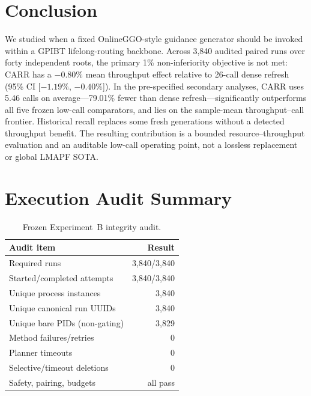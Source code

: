 \documentclass[sigconf,review,anonymous]{acmart}
\newcommand{\carr}{\textsc{CARR}\xspace}
\begin{document}
\section{Conclusion}

We studied when a fixed OnlineGGO-style guidance generator should be invoked
within a GPIBT lifelong-routing backbone. Across 3{,}840 audited paired runs
over forty independent roots, the primary 1\% non-inferiority objective is not
met: \carr has a $-0.80\%$ mean throughput effect relative to 26-call dense
refresh (95\% CI [$-1.19\%$, $-0.40\%$]). In the pre-specified secondary
analyses, \carr uses 5.46 calls on average---79.01\% fewer than dense
refresh---significantly outperforms all five frozen low-call comparators, and
lies on the sample-mean throughput--call frontier. Historical recall replaces
some fresh generations without a detected throughput benefit. The resulting
contribution is a bounded resource--throughput evaluation and an auditable
low-call operating point, not a lossless replacement or global LMAPF SOTA.

\FloatBarrier



\appendix

\section{Execution Audit Summary}

\begin{table}[h]
\caption{Frozen Experiment~B integrity audit.}
\centering
\small
\begin{tabular}{lr}
\toprule
Audit item & Result \\
\midrule
Required runs & 3{,}840/3{,}840 \\
Started/completed attempts & 3{,}840/3{,}840 \\
Unique process instances & 3{,}840 \\
Unique canonical run UUIDs & 3{,}840 \\
Unique bare PIDs (non-gating) & 3{,}829 \\
Method failures/retries & 0 \\
Planner timeouts & 0 \\
Selective/timeout deletions & 0 \\
Safety, pairing, budgets & all pass \\
\bottomrule
\end{tabular}
\end{table}
\end{document}
